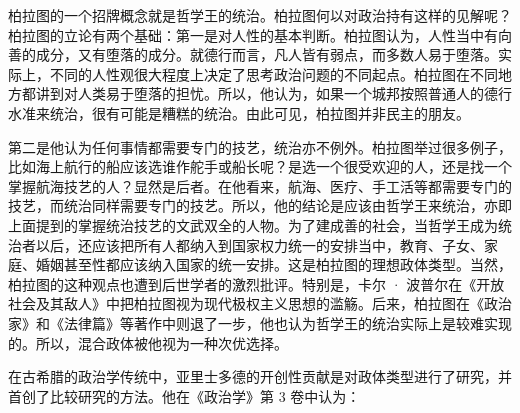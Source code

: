 
柏拉图的一个招牌概念就是哲学王的统治。柏拉图何以对政治持有这样的见解呢？柏拉图的立论有两个基础：第一是对人性的基本判断。柏拉图认为，人性当中有向善的成分，又有堕落的成分。就德行而言，凡人皆有弱点，而多数人易于堕落。实际上，不同的人性观很大程度上决定了思考政治问题的不同起点。柏拉图在不同地方都讲到对人类易于堕落的担忧。所以，他认为，如果一个城邦按照普通人的德行水准来统治，很有可能是糟糕的统治。由此可见，柏拉图并非民主的朋友。

第二是他认为任何事情都需要专门的技艺，统治亦不例外。柏拉图举过很多例子，比如海上航行的船应该选谁作舵手或船长呢？是选一个很受欢迎的人，还是找一个掌握航海技艺的人？显然是后者。在他看来，航海、医疗、手工活等都需要专门的技艺，而统治同样需要专门的技艺。所以，他的结论是应该由哲学王来统治，亦即上面提到的掌握统治技艺的文武双全的人物。为了建成善的社会，当哲学王成为统治者以后，还应该把所有人都纳入到国家权力统一的安排当中，教育、子女、家庭、婚姻甚至性都应该纳入国家的统一安排。这是柏拉图的理想政体类型。当然，柏拉图的这种观点也遭到后世学者的激烈批评。特别是，卡尔 · 波普尔在《开放社会及其敌人》中把柏拉图视为现代极权主义思想的滥觞。后来，柏拉图在《政治家》和《法律篇》等著作中则退了一步，他也认为哲学王的统治实际上是较难实现的。所以，混合政体被他视为一种次优选择。

在古希腊的政治学传统中，亚里士多德的开创性贡献是对政体类型进行了研究，并首创了比较研究的方法。他在《政治学》第 3 卷中认为：


